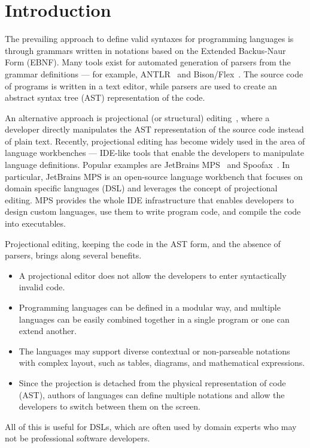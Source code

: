\section{Introduction}

The prevailing approach to define valid syntaxes for programming languages is through grammars written in notations based on the Extended Backus-Naur Form (EBNF).
Many tools exist for automated generation of parsers from the grammar definitions --- for example, ANTLR~\cite{ref:ANTLRBOOK,ref:ANTLR} and Bison/Flex~\cite{ref:BISONFLEX}.
The source code of programs is written in a text editor, while parsers are used to create an abstract syntax tree (AST) representation of the code.

An alternative approach is projectional (or structural) editing~\cite{ref:VWK15,ref:VSB14,ref:DHL80}, where a developer directly manipulates the AST representation of the source code instead of plain text.
Recently, projectional editing has become widely used in the area of language workbenches --- IDE-like tools that enable the developers to manipulate language definitions.
Popular examples are JetBrains MPS~\cite{ref:MPS,ref:MPSBOOK} and Spoofax~\cite{ref:KV10}.
In particular, JetBrains MPS is an open-source language workbench that focuses on domain specific languages (DSL) and leverages the concept of projectional editing.
MPS provides the whole IDE infrastructure that enables developers to design custom languages, use them to write program code, and compile the code into executables.

Projectional editing, keeping the code in the AST form, and the absence of parsers, brings along several benefits.
\begin{itemize}
	\item A projectional editor does not allow the developers to enter syntactically invalid code.
	\item Programming languages can be defined in a modular way, and multiple languages can be easily combined together in a single program or one can extend another.
	\item The languages may support diverse contextual or non-parseable notations with complex layout, such as tables, diagrams, and mathematical expressions.
	\item Since the projection is detached from the physical representation of code (AST), authors of languages can define multiple notations and allow the developers to switch between them on the screen.
\end{itemize}
All of this is useful for DSLs, which are often used by domain experts who may not be professional software developers.

